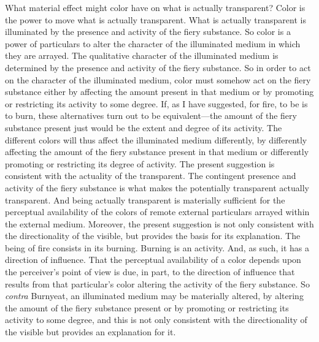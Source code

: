 What material effect might color have on what is actually transparent? Color is the power to move what is actually transparent. What is actually transparent is illuminated by the presence and activity of the fiery substance. So color is a power of particulars to alter the character of the illuminated medium in which they are arrayed. The qualitative character of the illuminated medium is determined by the presence and activity of the fiery substance. So in order to act on the character of the illuminated medium, color must somehow act on the fiery substance either by affecting the amount present in that medium or by promoting or restricting its activity to some degree. If, as I have suggested, for fire, to be is to burn, these alternatives turn out to be equivalent---the amount of the fiery substance present just would be the extent and degree of its activity. The different colors will thus affect the illuminated medium differently, by differently affecting the amount of the fiery substance present in that medium or differently promoting or restricting its degree of activity. The present suggestion is consistent with the actuality of the transparent. The contingent presence and activity of the fiery substance is what makes the potentially transparent actually transparent. And being actually transparent is materially sufficient for the perceptual availability of the colors of remote external particulars arrayed within the external medium. Moreover, the present suggestion is not only consistent with the directionality of the visible, but provides the basis for its explanation. The being of fire consists in its burning. Burning is an activity. And, as such, it has a direction of influence. That the perceptual availability of a color depends upon the perceiver's point of view is due, in part, to the direction of influence that results from that particular's color altering the activity of the fiery substance. So \emph{contra} Burnyeat, an illuminated medium may be materially altered, by altering the amount of the fiery substance present or by promoting or restricting its activity to some degree, and this is not only consistent with the directionality of the visible but provides an explanation for it.

